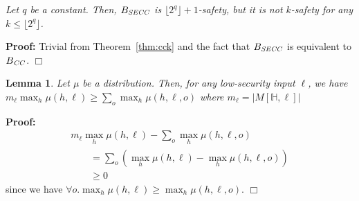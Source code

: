 \documentclass{llncs}
\newtheorem{lemma}[theorem]{Lemma}
\newenvironment{proof}{\noindent\rm{\bf Proof:}}{\hbox{$\Box$}\vspace*{0.2\baselineskip}}
\newenvironment{reftheorem}[1]{\begin{trivlist}\item[\hskip
      \labelsep{\bf Theorem #1.}]\it}{\end{trivlist}}
\begin{document}
\begin{reftheorem}{\ref{thm:secck}}
Let $q$ be a constant.  Then, $B_{\it SECC}$ is
$\lfloor2^q\rfloor+1$-safety, but it is not $k$-safety for any $k \leq
\lfloor2^q\rfloor$.
\end{reftheorem}
\begin{proof}
  Trivial from Theorem~\ref{thm:cck} and the fact that $B_{\it SECC}$
  is equivalent to $B_{\it CC}$.
\end{proof}

\begin{lemma}
\label{lem:mecclemma}
Let $\mu$ be a distribution.  Then, for any low-security input $\ell$,
we have $m_\ell\max_h\mu(h,\ell)\ge\sum_o\max_h\mu(h,\ell,o)$ where
$m_\ell= |M[\mathbb{H},\ell]|$
\end{lemma}
\begin{proof}
\[
\begin{array}{l}
m_\ell\max_h\mu(h,\ell)-\sum_o\max_h\mu(h,\ell,o)\\
\qquad=\sum_o(\max_h\mu(h,\ell)-\max_h\mu(h,\ell,o))\\
\qquad\ge 0
\end{array}
\]
since we have $\forall o.\max_h\mu(h,\ell)\ge\max_h\mu(h,\ell,o)$.
\end{proof}
\end{document}
